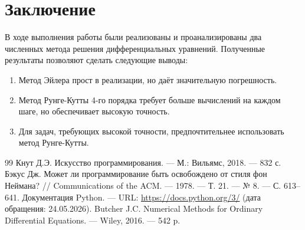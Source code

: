 \documentclass{SCWorks}
\begin{document}
	\section{Заключение}
	
	В ходе выполнения работы были реализованы и проанализированы два численных метода решения дифференциальных уравнений. Полученные результаты позволяют сделать следующие выводы:
	
	\begin{enumerate}
		\item Метод Эйлера прост в реализации, но даёт значительную погрешность.
		\item Метод Рунге-Кутты 4-го порядка требует больше вычислений на каждом шаге, но обеспечивает высокую точность.
		\item Для задач, требующих высокой точности, предпочтительнее использовать метод Рунге-Кутты.
	\end{enumerate}
	
	\begin{thebibliography}{99}
		 Кнут Д.Э. Искусство программирования. — М.: Вильямс, 2018. — 832 с.
		 Бэкус Дж. Может ли программирование быть освобождено от стиля фон Неймана? // Communications of the ACM. — 1978. — Т. 21. — № 8. — С. 613–641.
		 Документация Python. — URL: \url{https://docs.python.org/3/} (дата обращения: 24.05.2026).
		 Butcher J.C. Numerical Methods for Ordinary Differential Equations. — Wiley, 2016. — 542 p.
	\end{thebibliography}
	
\end{document}
